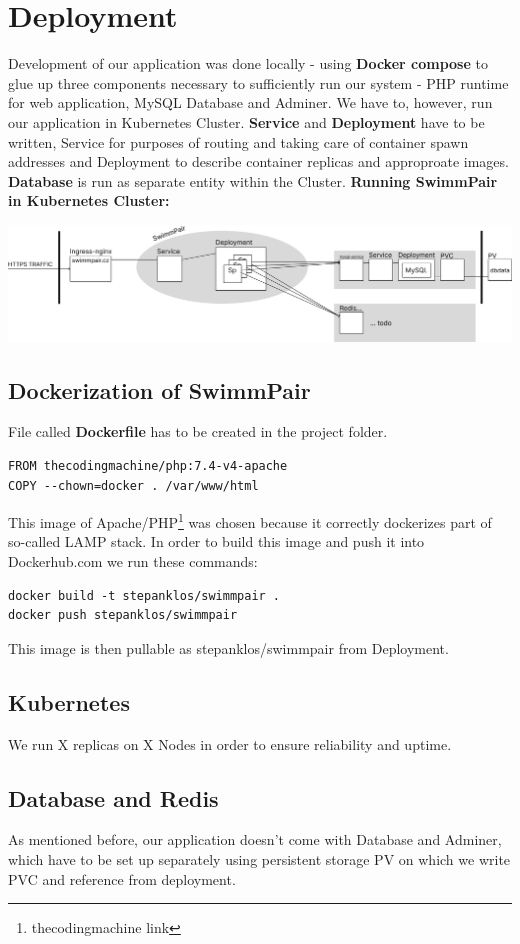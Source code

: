 \chapter{Deployment}
Development of our application was done locally - using \textbf{Docker compose} to glue up three components necessary to sufficiently run our system - PHP runtime for web application, MySQL Database and Adminer. We have to, however, run our application in Kubernetes Cluster. \textbf{Service} and \textbf{Deployment} have to be written, Service for purposes of routing and taking care of container spawn addresses and Deployment to describe container replicas and approproate images. \textbf{Database} is run as separate entity within the Cluster.
\newline
\textbf{Running SwimmPair in Kubernetes Cluster:}
\par
\includegraphics[scale=0.275]{img/swimmpair_deployment_k8s.png}
\section*{Dockerization of SwimmPair}
File called \textbf{Dockerfile} has to be created in the project folder.
\begin{lstlisting}
FROM thecodingmachine/php:7.4-v4-apache
COPY --chown=docker . /var/www/html
\end{lstlisting}
This image of Apache/PHP\footnote{thecodingmachine link} was chosen because it correctly dockerizes part of so-called LAMP stack. In order to build this image and push it into Dockerhub.com we run these commands:
\begin{lstlisting}
docker build -t stepanklos/swimmpair .
docker push stepanklos/swimmpair
\end{lstlisting}
This image is then pullable as stepanklos/swimmpair from Deployment.
\section*{Kubernetes}
We run X replicas on X Nodes in order to ensure reliability and uptime. 
\section*{Database and Redis}
As mentioned before, our application doesn't come with Database and Adminer, which have to be set up separately using persistent storage PV on which we write PVC and reference from deployment. 
